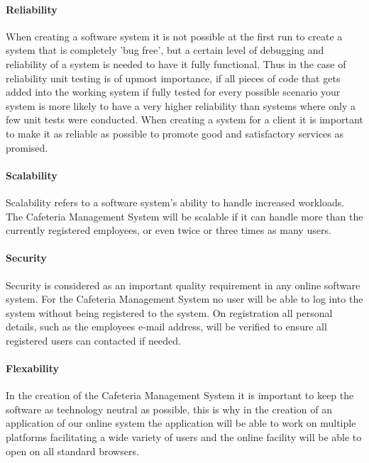 \documentclass[12pt]{article}
\begin{document}
\paragraph{ Reliability\\}
When creating a software system it is not possible at the first run to create a system that is completely 'bug free', but a certain level of debugging and reliability of a system is needed to have it fully functional. Thus in the case of reliability unit testing is of upmost importance, if all pieces of code that gets added into the working system if fully tested for every possible scenario your system is more likely to have a very higher reliability than systems where only a few unit tests were conducted. When creating a system for a client it is important to make it as reliable as possible to promote good and satisfactory services as promised.

\paragraph{Scalability\\}
Scalability refers to a software system's ability to handle increased workloads. The Cafeteria Management System will be scalable if it can handle more than the currently registered employees, or even twice or three times  as many users.  

\paragraph{Security\\}
Security is considered as an important quality requirement in any online software system. For the Cafeteria Management System no user will be able to log into the system without being registered to the system. On registration all personal details, such as the employees e-mail address, will be verified to ensure all registered users can contacted if needed.

\paragraph{Flexability\\}
In the creation of the Cafeteria Management System it is important to keep the software as technology neutral as possible, this is why in the creation of an application of our online system the application will be able to work on multiple platforms facilitating a wide variety of users and the online facility will be able to open on all standard browsers. 
\end{document}
